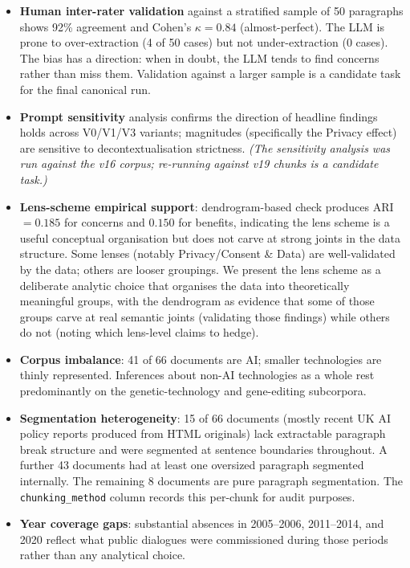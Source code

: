 \documentclass[11pt, a4paper]{article}
\begin{document}
\begin{itemize}
\item \textbf{Human inter-rater validation} against a stratified sample
      of 50 paragraphs shows 92\% agreement and Cohen's $\kappa = 0.84$
      (almost-perfect).  The LLM is prone to over-extraction (4 of 50
      cases) but not under-extraction (0 cases).  The bias has a
      direction: when in doubt, the LLM tends to find concerns rather
      than miss them.  Validation against a larger sample is a candidate
      task for the final canonical run.
\item \textbf{Prompt sensitivity} analysis confirms the direction of
      headline findings holds across V0/V1/V3 variants; magnitudes
      (specifically the Privacy effect) are sensitive to
      decontextualisation strictness.  \emph{(The sensitivity analysis
      was run against the v16 corpus; re-running against v19 chunks is a
      candidate task.)}
\item \textbf{Lens-scheme empirical support}: dendrogram-based check
      produces ARI $= 0.185$ for concerns and $0.150$ for benefits,
      indicating the lens scheme is a useful conceptual organisation but
      does not carve at strong joints in the data structure.  Some lenses
      (notably Privacy/Consent \& Data) are well-validated by the data;
      others are looser groupings.  We present the lens scheme as a
      deliberate analytic choice that organises the data into
      theoretically meaningful groups, with the dendrogram as evidence
      that some of those groups carve at real semantic joints (validating
      those findings) while others do not (noting which lens-level claims
      to hedge).
\item \textbf{Corpus imbalance}: 41 of 66 documents are AI; smaller
      technologies are thinly represented.  Inferences about non-AI
      technologies as a whole rest predominantly on the
      genetic-technology and gene-editing subcorpora.
\item \textbf{Segmentation heterogeneity}: 15 of 66 documents (mostly
      recent UK AI policy reports produced from HTML originals) lack
      extractable paragraph break structure and were segmented at
      sentence boundaries throughout.  A further 43 documents had at
      least one oversized paragraph segmented internally.  The remaining
      8 documents are pure paragraph segmentation.  The
      \texttt{chunking\_method} column records this per-chunk for audit
      purposes.
\item \textbf{Year coverage gaps}: substantial absences in 2005--2006,
      2011--2014, and 2020 reflect what public dialogues were
      commissioned during those periods rather than any analytical
      choice.
\end{itemize}
\end{document}
